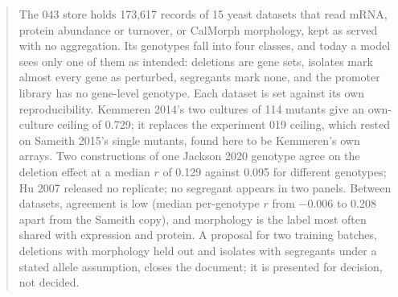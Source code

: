 
\begin{abstract}
\noindent
The 043 store holds 173{,}617 records of 15 yeast datasets that read mRNA, protein
abundance or turnover, or CalMorph morphology, kept as served with no aggregation. Its
genotypes fall into four classes, and today a model sees only one of them as intended:
deletions are gene sets, isolates mark almost every gene as perturbed, segregants mark
none, and the promoter library has no gene-level genotype. Each dataset is set against
its own reproducibility. Kemmeren 2014's two cultures of 114 mutants give an own-culture
ceiling of 0.729; it replaces the experiment 019 ceiling, which rested on Sameith 2015's
single mutants, found here to be Kemmeren's own arrays. Two constructions of one Jackson
2020 genotype agree on the deletion effect at a median $r$ of 0.129 against 0.095 for
different genotypes; Hu 2007 released no replicate; no segregant appears in two panels.
Between datasets, agreement is low (median per-genotype $r$ from $-$0.006 to 0.208 apart
from the Sameith copy), and morphology is the label most often shared with expression and
protein. A proposal for two training batches, deletions with morphology held out and
isolates with segregants under a stated allele assumption, closes the document; it is
presented for decision, not decided.
\end{abstract}

